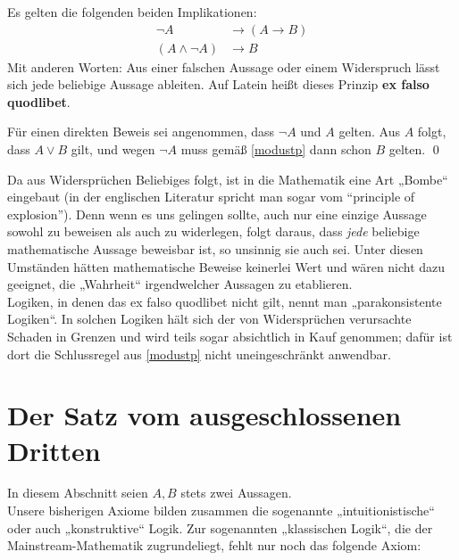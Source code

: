 \begin{sat} \label{exfalso}
Es gelten die folgenden beiden Implikationen:
 \begin{align*}
  \neg A & \to (A\to B) \\
  (A\land \neg A) & \to B
 \end{align*}
 Mit anderen Worten: Aus einer falschen Aussage oder einem Widerspruch lässt sich jede beliebige Aussage ableiten. Auf Latein heißt dieses Prinzip \textbf{ex falso quodlibet}.
\end{sat}
\begin{bew}
Für einen direkten Beweis sei angenommen, dass $\neg A$ und $A$ gelten. Aus $A$ folgt, dass $A\lor B$ gilt, und wegen $\neg A$ muss gemäß \cref{modustp} dann schon $B$ gelten. \qed
\end{bew}





\begin{bem}
Da aus Widersprüchen Beliebiges folgt, ist in die Mathematik eine Art „Bombe“ eingebaut (in der englischen Literatur spricht man sogar vom ``principle of explosion''). Denn wenn es uns gelingen sollte, auch nur eine einzige Aussage sowohl zu beweisen als auch zu widerlegen, folgt daraus, dass \emph{jede} beliebige mathematische Aussage beweisbar ist, so unsinnig sie auch sei. Unter diesen Umständen hätten mathematische Beweise keinerlei Wert und wären nicht dazu geeignet, die „Wahrheit“ irgendwelcher Aussagen zu etablieren. \\
Logiken, in denen das ex falso quodlibet nicht gilt, nennt man „parakonsistente Logiken“. In solchen Logiken hält sich der von Widersprüchen verursachte Schaden in Grenzen und wird teils sogar absichtlich in Kauf genommen; dafür ist dort die Schlussregel aus \cref{modustp} nicht uneingeschränkt anwendbar.
\end{bem}









\section{Der Satz vom ausgeschlossenen Dritten}
In diesem Abschnitt seien $A,B$ stets zwei Aussagen. \\
Unsere bisherigen Axiome bilden zusammen die sogenannte „intuitionistische“ oder auch „konstruktive“ Logik. Zur sogenannten „klassischen Logik“, die der Mainstream-Mathematik zugrundeliegt, fehlt nur noch das folgende Axiom:




